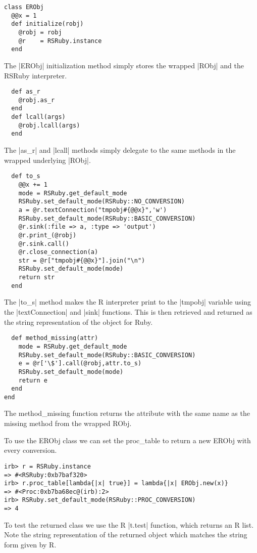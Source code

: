 \documentclass[a4paper,12pt]{book}
\begin{document}
\begin{Verbatim}
class ERObj
  @@x = 1
  def initialize(robj)
    @robj = robj
    @r    = RSRuby.instance
  end
\end{Verbatim}

The |ERObj| initialization method simply stores the wrapped |RObj| and the RSRuby interpreter.

\begin{Verbatim}
  def as_r
    @robj.as_r
  end
  def lcall(args)
    @robj.lcall(args)
  end
\end{Verbatim}

The |as_r| and |lcall| methods simply delegate to the same methods in the wrapped underlying |RObj|.

\begin{Verbatim}
  def to_s
    @@x += 1
    mode = RSRuby.get_default_mode
    RSRuby.set_default_mode(RSRuby::NO_CONVERSION)
    a = @r.textConnection("tmpobj#{@@x}",'w')
    RSRuby.set_default_mode(RSRuby::BASIC_CONVERSION)
    @r.sink(:file => a, :type => 'output')
    @r.print_(@robj)
    @r.sink.call()
    @r.close_connection(a)
    str = @r["tmpobj#{@@x}"].join("\n")
    RSRuby.set_default_mode(mode)
    return str
  end
\end{Verbatim}

The |to_s| method makes the R interpreter print to the |tmpobj| variable using the |textConnection| and |sink| functions. This is then retrieved and returned as the string representation of the object for Ruby.

\begin{Verbatim}
  def method_missing(attr)
    mode = RSRuby.get_default_mode
    RSRuby.set_default_mode(RSRuby::BASIC_CONVERSION)
    e = @r['\$'].call(@robj,attr.to_s)
    RSRuby.set_default_mode(mode)
    return e
  end
end
\end{Verbatim}

The method\_missing function returns the attribute with the same name as the missing method from the wrapped RObj.

To use the ERObj class we can set the proc\_table to return a new ERObj with every conversion.

\begin{Verbatim}
irb> r = RSRuby.instance
=> #<RSRuby:0xb7baf320>
irb> r.proc_table[lambda{|x| true}] = lambda{|x| ERObj.new(x)}
=> #<Proc:0xb7ba68ec@(irb):2>
irb> RSRuby.set_default_mode(RSRuby::PROC_CONVERSION)
=> 4
\end{Verbatim}

To test the returned class we use the R |t.test| function, which returns an R list. Note the string representation of the returned object which matches the string form given by R. 
\end{document}
